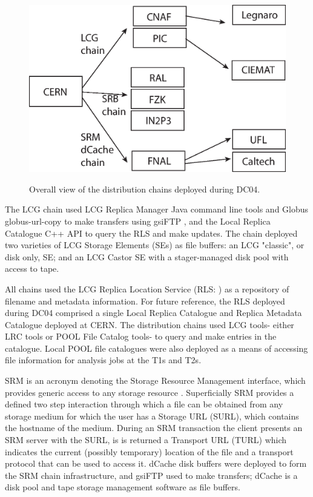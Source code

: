 \documentclass{cmspaper}
\begin{document}
\begin{figure}[tbp]
\centering
\includegraphics[angle = 90]{chains.eps} 
\label{fig:chains}
\caption{Overall view of the distribution chains deployed during DC04.}
\end{figure}

The LCG chain used LCG Replica Manager Java command line tools
\cite{rmapi} and Globus globus-url-copy \cite{globus} to make
transfers using gsiFTP \cite{gsiftp}, and the Local Replica Catalogue
C++ API \cite{lrcapi} to query the RLS and make updates. The chain
deployed two varieties of LCG Storage Elements (SEs) as file buffers:
an LCG "classic", or disk only, SE; and an LCG Castor SE with a
stager-managed disk pool with access to tape.

All chains used the LCG Replica Location Service (RLS: \cite{rls}) as
a repository of filename and metadata information. For future
reference, the RLS deployed during DC04 comprised a single Local
Replica Catalogue and Replica Metadata Catalogue deployed at CERN. The
distribution chains used LCG tools- either LRC tools or POOL
\cite{POOL} File Catalog tools- to query and make entries in the
catalogue. Local POOL file catalogues were also deployed as a means of
accessing file information for analysis jobs at the T1s and T2s.

SRM is an acronym denoting the Storage Resource Management interface,
which provides generic access to any storage resource
\cite{srm}. Superficially SRM provides a defined two step interaction
through which a file can be obtained from any storage medium for which
the user has a Storage URL (SURL), which contains the hostname of the
medium. During an SRM transaction the client presents an SRM server
with the SURL, is is returned a Transport URL (TURL) which indicates
the current (possibly temporary) location of the file and a transport
protocol that can be used to access it. dCache disk buffers were
deployed to form the SRM chain infrastructure, and gsiFTP used to make
transfers; dCache \cite{dcache} is a disk pool and tape storage
management software as file buffers.
\end{document}
